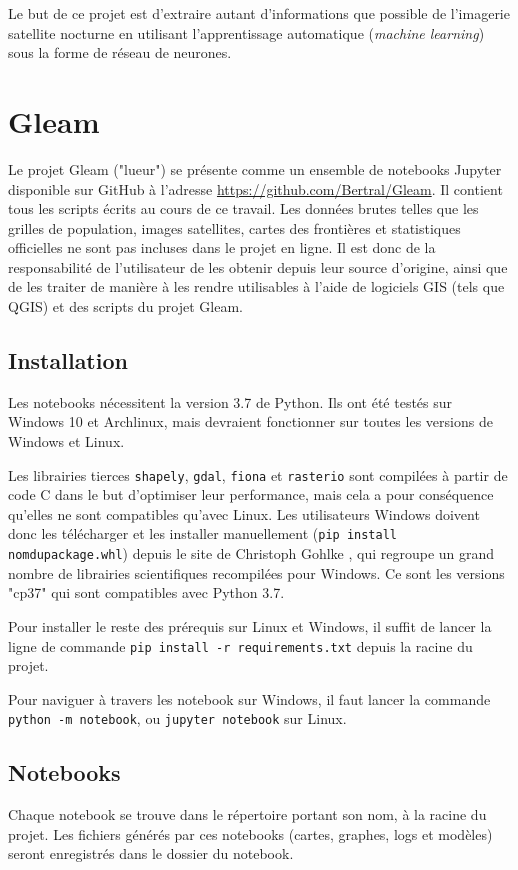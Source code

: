 \documentclass[a4paper, 11pt]{report}
\begin{document}
Le but de ce projet est d'extraire autant d'informations que possible de l'imagerie satellite nocturne en utilisant l'apprentissage automatique (\textit{machine learning}) sous la forme de réseau de neurones.

\chapter{Gleam}

Le projet Gleam ("lueur") se présente comme un ensemble de notebooks Jupyter disponible sur GitHub à l'adresse \url{https://github.com/Bertral/Gleam}. Il contient tous les scripts écrits au cours de ce travail. Les données brutes telles que les grilles de population, images satellites, cartes des frontières et statistiques officielles ne sont pas incluses dans le projet en ligne. Il est donc de la responsabilité de l'utilisateur de les obtenir depuis leur source d'origine, ainsi que de les traiter de manière à les rendre utilisables à l'aide de logiciels GIS (tels que QGIS) et des scripts du projet Gleam.

\section{Installation}
Les notebooks nécessitent la version 3.7 de Python. Ils ont été testés sur Windows 10 et Archlinux, mais devraient fonctionner sur toutes les versions de Windows et Linux.

Les librairies tierces \texttt{shapely}, \texttt{gdal}, \texttt{fiona} et \texttt{rasterio} sont compilées à partir de code C dans le but d'optimiser leur performance, mais cela a pour conséquence qu'elles ne sont compatibles qu'avec Linux. Les utilisateurs Windows doivent donc les télécharger et les installer manuellement (\texttt{pip install nomdupackage.whl}) depuis le site de  Christoph Gohlke \cite{winlibs}, qui regroupe un grand nombre de librairies scientifiques recompilées pour Windows. Ce sont les versions "cp37" qui sont compatibles avec Python 3.7. 

Pour installer le reste des prérequis sur Linux et Windows, il suffit de lancer la ligne de commande \texttt{pip install -r requirements.txt} depuis la racine du projet.

Pour naviguer à travers les notebook sur Windows, il faut lancer la commande \texttt{python -m notebook}, ou \texttt{jupyter notebook} sur Linux.

\section{Notebooks}
Chaque notebook se trouve dans le répertoire portant son nom, à la racine du projet. Les fichiers générés par ces notebooks (cartes, graphes, logs et modèles) seront enregistrés dans le dossier du notebook.
\end{document}
